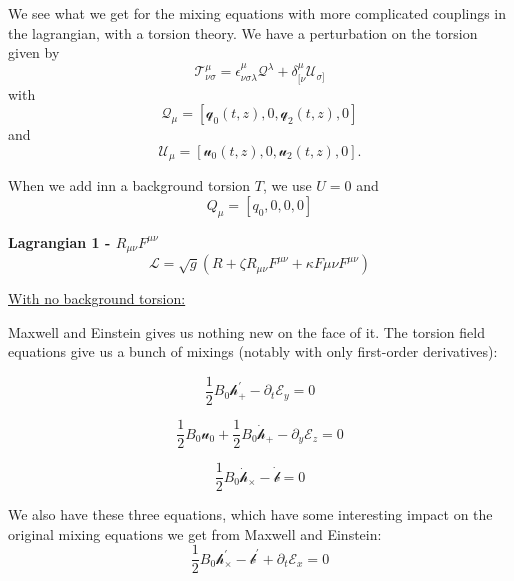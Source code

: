 \documentclass[letterpaper,12pt]{article}
\begin{document}
We see what we get for the mixing equations with more complicated couplings in the lagrangian, with a torsion theory. We have a perturbation on the torsion given by 
\begin{equation}
\mathcal{T}^{\mu}_{\nu \sigma}=\epsilon^{\mu}_{\nu \sigma \lambda} \mathcal{Q}^{\lambda}+\delta^{\mu}_{[\nu} \mathcal{U}_{\sigma]}
\end{equation}
with
\begin{equation}
\mathcal{Q}_{\mu}=[\mathcal{q}_0(t,z),0,\mathcal{q}_2(t,z),0]
\end{equation}
and
\begin{equation}
\mathcal{U}_{\mu}=[\mathcal{u}_0(t,z),0,\mathcal{u}_2(t,z),0].
\end{equation}

When we add inn a background torsion $T$, we use $U=0$ and 
\begin{equation}
Q_{\mu}=[q_0,0,0,0]
\end{equation}


\textbf{Lagrangian 1 - $R_{\mu \nu} F^{\mu \nu}$}
\begin{equation}
\mathcal{L}=\sqrt{g}(R+\zeta R_{\mu \nu} F^{\mu \nu}+\kappa F{\mu \nu}F^{\mu \nu})
\end{equation}

\underline{With no background torsion:}

Maxwell and Einstein gives us nothing new on the face of it. The torsion field equations give us a bunch of mixings (notably with only first-order derivatives):

\begin{equation}
\frac{1}{2}  B_0 \mathcal{h}_{+}^{'} -  \partial_{t}\mathcal{E}_y=0
\end{equation}

\begin{equation}
\frac{1}{2} B_0 \mathcal{u}_0 + \frac{1}{2} B_0 \dot{\mathcal{h}}_{+}-\partial_{y} \mathcal{E}_z=0
\end{equation}

\begin{equation}
\frac{1}{2} B_0 \dot{\mathcal{h}}_{\times} - \dot{\mathcal{b}}=0
\end{equation}

We also have these three equations, which have some interesting impact on the original mixing equations we get from Maxwell and Einstein:
\begin{equation}
\frac{1}{2} B_0 \mathcal{h}_{\times}^{'}-\mathcal{b}^{'}+\partial_t \mathcal{E}_x=0
\end{equation}
\end{document}

